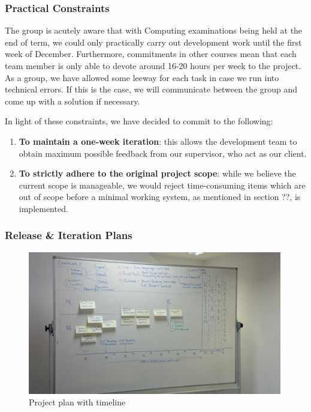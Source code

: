 \documentclass[a4paper, titlepage]{article}
\begin{document}
\subsubsection{Practical Constraints}
The group is acutely aware that with Computing examinations being held at the
end of term, we could only practically carry out development work until the
first week of December. Furthermore, commitments in other courses mean that 
each team member is only able to devote around 16-20 hours per week to
the project. As a group, we have allowed some leeway for each task in case we run into technical errors. If this is the case, we will communicate between the group and come up with a solution if necessary.

In light of these constraints, we have decided to commit to the following:
\begin{enumerate}
  \item \textbf{To maintain a one-week iteration}: this allows the development team to
        obtain maximum possible feedback from our supervisor, who act as our client.
  \item \textbf{To strictly adhere to the original project scope}: while we believe the
        current scope is manageable, we would reject time-consuming items which
        are out of scope before a minimal working system, as mentioned in section ??, is implemented.
\end{enumerate}

\subsubsection{Release \& Iteration Plans}

\begin{figure}[h]
  \centering
    \includegraphics[width = 0.99\textwidth]{./projman/timeline.jpg}
  \caption{Project plan with timeline}
  \label{fig:projman_timeline}
\end{figure}
\end{document}
